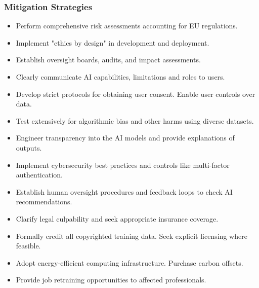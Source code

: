 \subsubsection{Mitigation Strategies}

\begin{itemize}
\item Perform comprehensive risk assessments accounting for EU regulations.

\item Implement "ethics by design" in development and deployment.

\item Establish oversight boards, audits, and impact assessments.

\item Clearly communicate AI capabilities, limitations and roles to users.

\item Develop strict protocols for obtaining user consent. Enable user controls over data.

\item Test extensively for algorithmic bias and other harms using diverse datasets.

\item Engineer transparency into the AI models and provide explanations of outputs.

\item Implement cybersecurity best practices and controls like multi-factor authentication.

\item Establish human oversight procedures and feedback loops to check AI recommendations.

\item Clarify legal culpability and seek appropriate insurance coverage.

\item Formally credit all copyrighted training data. Seek explicit licensing where feasible.

\item Adopt energy-efficient computing infrastructure. Purchase carbon offsets.

\item Provide job retraining opportunities to affected professionals.
\end{itemize}

